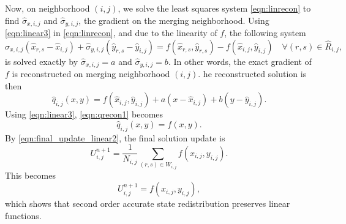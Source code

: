 Now, on neighborhood $(i,j)$, we solve the least squares system 
\eqref{eqn:linrecon} to find $\widehat{\sigma}_{x,i,j}$ and
$\widehat{\sigma}_{y,i,j}$, the gradient on the merging neighborhood.  Using
\eqref{eqn:linear3} in \eqref{eqn:linrecon}, and due to the linearity of $f$, the following system
\begin{equation}
\widehat{\sigma}_{x,i,j}(\widehat{x}_{r,s} - \widehat{x}_{i,j}) + \widehat{\sigma}_{y,i,j}(\widehat{y}_{r,s} - \widehat{y}_{i,j})= f(\widehat{x}_{r,s}, \widehat{y}_{r,s}) - f(\widehat{x}_{i,j}, \widehat{y}_{i,j}) \quad \forall (r,s) \in \widehat{R}_{i,j},
\end{equation}
is solved exactly by $\widehat{\sigma}_{x,i,j}=a$ and
$\widehat{\sigma}_{y,i,j}=b$.  In other words, the exact gradient 
of $f$ is reconstructed on merging neighborhood $(i,j)$.  
he reconstructed solution is then
\begin{equation}
    \label{eqn:qrecon1}
    \hat{q}_{i,j}(x,y) = f(\widehat{x}_{i,j},\widehat{y}_{i,j}) + a(x-\widehat{x}_{i,j})+b(y-\widehat{y}_{i,j}) .
\end{equation}
Using \eqref{eqn:linear3}, \eqref{eqn:qrecon1} becomes
\begin{equation}
    \label{eqn:qrecon2}
    \hat{q}_{i,j}(x,y) = f(x,y).
\end{equation}
By \eqref{eqn:final_update_linear2}, the final solution update is
\begin{equation} 
U^{n+1}_{i,j} = \frac{1}{N_{i,j}}\sum_{(r,s) \in W_{i,j}}f(x_{i,j},y_{i,j}).
\end{equation}
This becomes
\begin{equation} 
U^{n+1}_{i,j} = f(x_{i,j},y_{i,j}),
\end{equation}
which shows that second order accurate state redistribution preserves linear functions.




